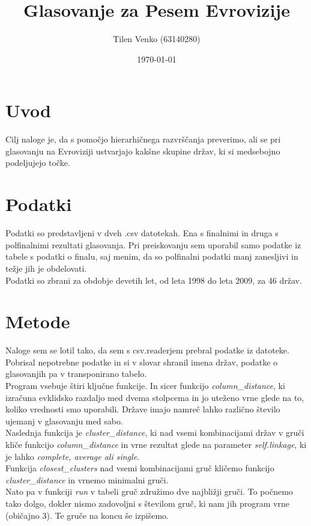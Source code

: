 \documentclass[a4paper,11pt]{article}
\title{Glasovanje za Pesem Evrovizije}
\author{Tilen Venko (63140280)}
\date{\today}
\begin{document}
\maketitle

\section{Uvod}

Cilj naloge je, da s pomočjo hierarhičnega razvrščanja preverimo, ali se pri glasovanju na Evroviziji ustvarjajo kakšne skupine držav, ki si medsebojno podeljujejo točke.

\section{Podatki}

Podatki so predstavljeni v dveh .csv datotekah. Ena s finalnimi in druga s polfinalnimi rezultati glasovanja. Pri preiskovanju sem uporabil samo podatke iz tabele s podatki o finalu, saj menim, da so polfinalni podatki manj zanesljivi in težje jih je obdelovati. \\
Podatki so zbrani za obdobje devetih let, od leta 1998 do leta 2009, za 46 držav. 

\section{Metode}

Naloge sem se lotil tako, da sem s csv.readerjem prebral podatke iz datoteke. Pobrisal nepotrebne podatke in si v slovar shranil imena držav, podatke o glasovanjih pa v transponirano tabelo. \\
Program vsebuje štiri ključne funkcije. In sicer funkcijo \textit{column\_distance}, ki izračuna evklidsko razdaljo med dvema stolpcema in jo uteženo vrne glede na to, koliko vrednosti smo uporabili. Države imajo namreč lahko različno število ujemanj v glasovanju med sabo. \\
Naslednja funkcija je \textit{cluster\_distance}, ki nad vsemi kombinacijami držav v gruči kliče funkcijo \textit{column\_distance} in vrne rezultat glede na parameter \textit{self.linkage}, ki je lahko \textit{complete, average ali single}.\\
Funkcija \textit{closest\_clusters} nad vsemi kombinacijami gruč kličemo funkcijo \textit{cluster\_distance} in vrnemo minimalni gruči.\\
Nato pa v funkciji \textit{run} v tabeli gruč združimo dve najbližji gruči. To počnemo tako dolgo, dokler nismo zadovoljni s številom gruč, ki nam jih program vrne (običajno 3). Te gruče na koncu še izpišemo.
\end{document}

